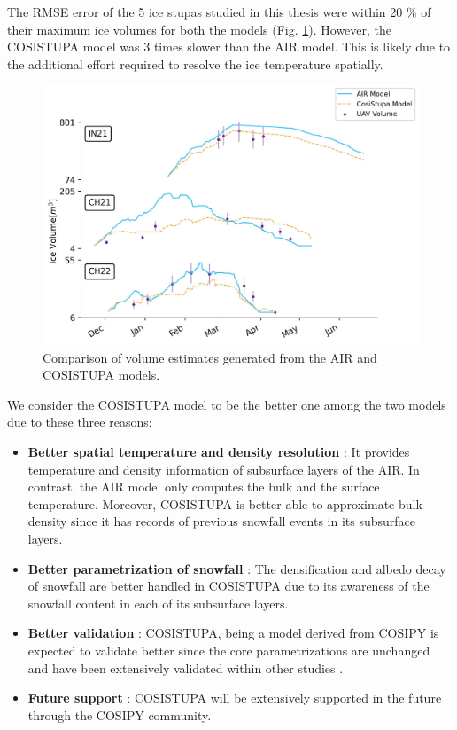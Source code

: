 The RMSE error of the 5 ice stupas studied in this thesis were within 20 \% of their maximum ice volumes for both
the models (Fig. \ref{fig:Cosistupa}).  However, the COSISTUPA model was 3 times slower than the AIR model. This
is likely due to the additional effort required to resolve the ice temperature spatially.

\begin{figure}[t]
	\centering
	\includegraphics[width=\textwidth]{figs/model_compare.jpg}

	\caption{Comparison of volume estimates generated from the AIR and COSISTUPA models.}

	\label{fig:Cosistupa}
\end{figure}

We consider the COSISTUPA model to be the better one among the two models due to these three reasons:

\begin{itemize}

	\item \textbf{Better spatial temperature and density resolution} : It provides temperature and density
	      information of subsurface layers of the AIR. In contrast, the AIR model only computes the bulk and the
	      surface temperature. Moreover, COSISTUPA is better able to approximate bulk density since it has records of
	      previous snowfall events in its subsurface layers.

	\item \textbf{Better parametrization of snowfall} : The densification and albedo decay of snowfall are better
	      handled in COSISTUPA due to its awareness of the snowfall content in each of its subsurface layers.

	\item \textbf{Better validation} : COSISTUPA, being a model derived from COSIPY is expected to validate better
	      since the core parametrizations are unchanged and have been extensively validated within other studies \citep{arndtAtmosphereDrivenMassBalance2021}.

	\item \textbf{Future support} : COSISTUPA will be extensively supported in the future through the COSIPY
	      community.

\end{itemize}

